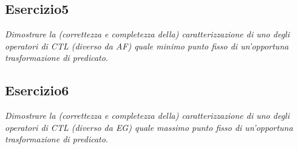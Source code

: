 \documentclass[12pt]{article}
\begin{document}
\subsection*{Esercizio5}
\textit{Dimostrare la (correttezza e completezza della) caratterizzazione di uno degli operatori di CTL (diverso da AF) quale minimo punto fisso di un’opportuna trasformazione di predicato.}


\subsection*{Esercizio6}
\textit{Dimostrare la (correttezza e completezza della) caratterizzazione di uno degli operatori di CTL (diverso da EG) quale massimo punto fisso di un’opportuna trasformazione di predicato.}
\end{document}

